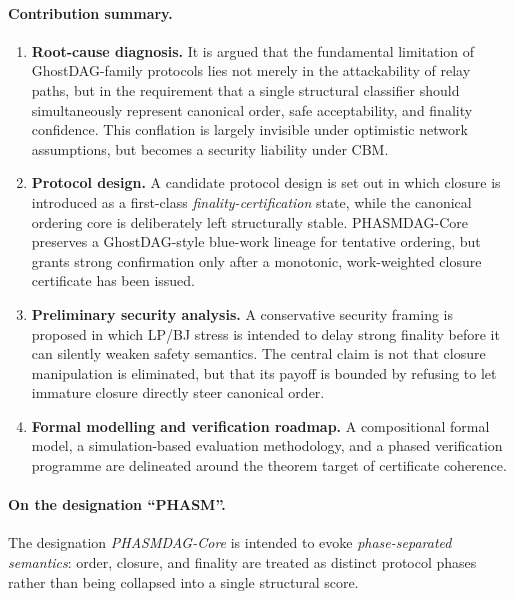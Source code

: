 \documentclass[11pt]{article}
\theoremstyle{definition}
\theoremstyle{plain}
\theoremstyle{remark}
\begin{document}
\paragraph{Contribution summary.}
\begin{enumerate}[nosep]
    \item \textbf{Root-cause diagnosis.}
    It is argued that the fundamental limitation of GhostDAG-family protocols
    lies not merely in the attackability of relay paths, but in the requirement
    that a single structural classifier should simultaneously represent
    canonical order, safe acceptability, and finality confidence.
    This conflation is largely invisible under optimistic network assumptions,
    but becomes a security liability under CBM.

    \item \textbf{Protocol design.}
    A candidate protocol design is set out in which closure is introduced as a
    first-class \emph{finality-certification} state, while the canonical
    ordering core is deliberately left structurally stable.
    PHASMDAG-Core preserves a GhostDAG-style blue-work lineage for tentative
    ordering, but grants strong confirmation only after a monotonic,
    work-weighted closure certificate has been issued.

    \item \textbf{Preliminary security analysis.}
    A conservative security framing is proposed in which LP/BJ stress is
    intended to delay strong finality before it can silently weaken safety
    semantics.
    The central claim is not that closure manipulation is eliminated, but that
    its payoff is bounded by refusing to let immature closure directly steer
    canonical order.

    \item \textbf{Formal modelling and verification roadmap.}
    A compositional formal model, a simulation-based evaluation methodology,
    and a phased verification programme are delineated around the theorem
    target of certificate coherence.
\end{enumerate}

\paragraph{On the designation ``PHASM''.}
The designation \emph{PHASMDAG-Core} is intended to evoke
\emph{phase-separated semantics}: order, closure, and finality are treated as
distinct protocol phases rather than being collapsed into a single structural
score.
\end{document}
